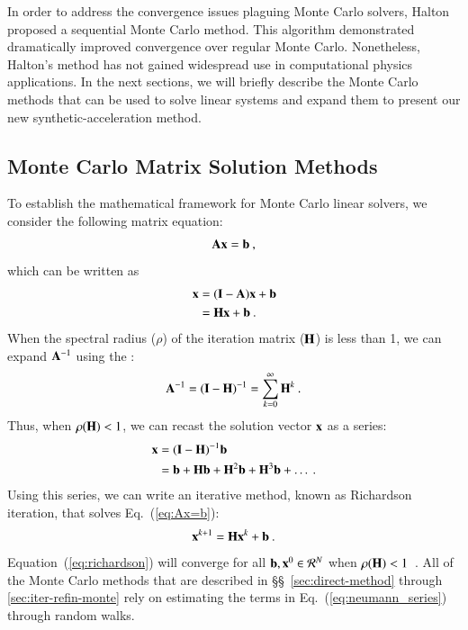 \documentclass[preprint,12pt]{elsarticle}
\newcommand{\vA}{\ensuremath{\ve{A}}}
\newcommand{\vb}{\ensuremath{\ve{b}}}
\newcommand{\vx}{\ensuremath{\ve{x}}}
\newcommand{\vI}{\ensuremath{\ve{I}}}
\newcommand{\vH}{\ensuremath{\ve{H}}}
\begin{document}
In order to address the convergence issues plaguing Monte Carlo
solvers, Halton \cite{halton_1962,halton_1994} proposed a sequential
Monte Carlo method.  This algorithm demonstrated dramatically improved
convergence over regular Monte Carlo.  Nonetheless, Halton's method
has not gained widespread use in computational physics
applications. In the next sections, we will briefly describe the Monte
Carlo methods that can be used to solve linear systems and expand them
to present our new synthetic-acceleration method.

\subsection{Monte Carlo Matrix Solution Methods}
\label{sec:background}

To establish the mathematical framework for Monte Carlo linear
solvers, we consider the following matrix equation:
\begin{equation}
  \vA\vx = \vb\:,
  \label{eq:Ax=b}
\end{equation}
which can be written as
\begin{equation}
  \begin{split}
    \vx &= (\vI - \vA)\vx + \vb\\ &= \vH\vx + \vb\:.
  \end{split}
  \label{eq:point_iteration}
\end{equation}
When the spectral radius ($\rho$) of the iteration matrix ($\vH$) is
less than 1, we can expand $\vA^{-1}$ using the :
\begin{equation}
  \vA^{-1} = (\vI - \vH)^{-1} = \sum_{k=0}^{\infty} \vH^k\:.
\end{equation}
Thus, when $\rho(\vH) < 1$, we can recast the solution vector $\vx$ as
a series:
\begin{equation}
  \begin{split}
    \vx &= (\vI - \vH)^{-1}\vb\\ &= \vb + \vH\vb + \vH^2\vb + \vH^3\vb
    + \ldots\:.
    \label{eq:neumann_series}
  \end{split}
\end{equation}
Using this series, we can write an iterative method, known as Richardson
iteration, that solves Eq.~(\ref{eq:Ax=b}):
\begin{equation}
  \vx^{k+1} = \vH\vx^k + \vb\:.
  \label{eq:richardson}
\end{equation}
Equation~(\ref{eq:richardson}) will converge for all $\vb,\vx^0 \in
\mathcal{R}^{N}$ when $\rho(\vH) < 1$~\cite{kelley_1995}.  All of the Monte
Carlo methods that are described in \S\S~\ref{sec:direct-method} through
\ref{sec:iter-refin-monte} rely on estimating the terms in
Eq.~(\ref{eq:neumann_series}) through random walks.
\end{document}
